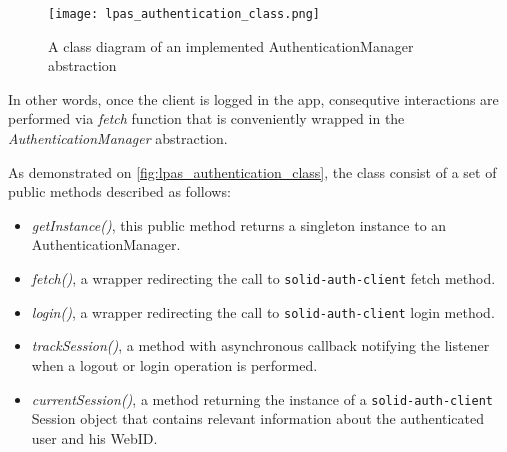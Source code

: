 \begin{figure}[h]
\centering
\texttt{[image: lpas\_authentication\_class.png]}
\caption{A class diagram of an implemented AuthenticationManager abstraction}
\label{fig:lpas_authentication_class}
\end{figure}


In other words, once the client is logged in the \solid{} app, consequtive interactions are performed via \textit{fetch} function that is conveniently wrapped in the \textit{AuthenticationManager} abstraction.

As demonstrated on \autoref{fig:lpas_authentication_class}, the class consist of a set of public methods described as follows:
\begin{itemize}
    \item \textit{getInstance()}, this public method returns a singleton instance to an AuthenticationManager.
    \item \textit{fetch()}, a wrapper redirecting the call to \texttt{solid-auth-client} fetch method.
    \item \textit{login()}, a wrapper redirecting the call to \texttt{solid-auth-client} login method.
    \item \textit{trackSession()}, a method with asynchronous callback notifying the listener when a logout or login operation is performed.
    \item \textit{currentSession()}, a method returning the instance of a \texttt{solid-auth-client} Session object that contains relevant information about the authenticated user and his WebID. 
\end{itemize}

